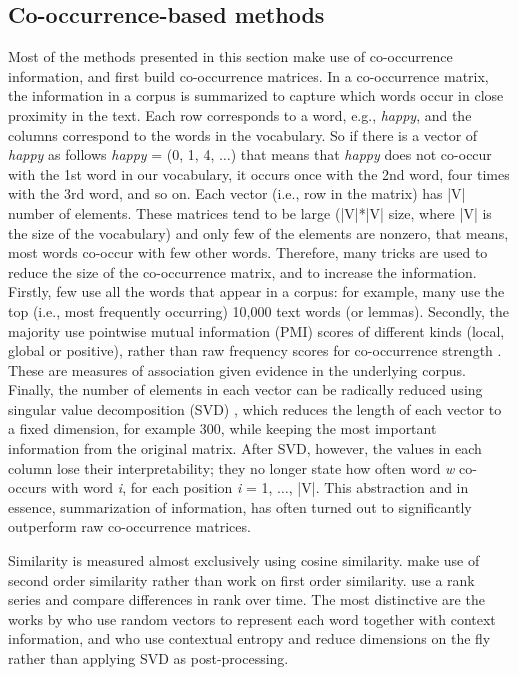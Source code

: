 \documentclass[output=paper]{langsci/langscibook}
\begin{document}
  	\subsection{Co-occurrence-based methods}\label{subs:co-occurenceb}
   
   Most of the methods presented in this section make use of co-occurrence information, and first build co-occurrence matrices.
 In a co-occurrence matrix, the information in a corpus is summarized to capture which words occur in close proximity in the text. Each row corresponds to a word, e.g., \textit{happy}, and the columns correspond to the words in the vocabulary. So if there is a vector of \textit{happy} as follows \textit{happy} = (0, 1, 4, $\ldots$) that means that \textit{happy} does not co-occur with the 1st word in our vocabulary, it occurs once with the 2nd word, four times with the 3rd word, and so on. Each vector (i.e., row in the matrix) has |V| number of elements.
  These matrices tend to be large (|V|*|V| size, where |V| is the size of the vocabulary) and only few of the elements are nonzero, that means, most words co-occur with few other words.
Therefore, many tricks are used to reduce the size of the co-occurrence matrix, and to increase the information. Firstly, few use all the words that appear in a corpus: for example, many use the top (i.e., most frequently occurring) 10,000 text words (or lemmas). 
Secondly, the majority use pointwise mutual information (PMI) scores of different kinds (local, global or positive), rather than raw frequency scores for co-occurrence strength \citep{bullinaria2012, levy2015, turney:2010}. These are measures of association given evidence in the underlying corpus.
Finally, the number of elements in each vector can be radically reduced using singular value decomposition (SVD) \citep{eckart1936}, which reduces the length of each vector to a fixed dimension, for example  300, while keeping the most important information from the original matrix. After SVD, however, the values in each column lose their interpretability; they no longer state how often word \textit{w} co-occurs with word \textit{i}, for each position \textit{i} = 1, $\ldots$, |V|. This abstraction and in essence, summarization of information, has often turned out to significantly outperform raw co-occurrence matrices.

 Similarity is measured almost exclusively using cosine similarity. \citet{rodda2016panta-journal} make use of second order similarity rather than work on first order similarity. \citet{kahmannnh17} use a rank series and compare differences in rank over time. The most distinctive are the works by \citet{basilediachronic} who use random vectors to represent each word together with context information, and \citet{tang2013} who use contextual entropy and reduce dimensions on the fly rather than applying SVD as post-processing.
    
\end{document}
